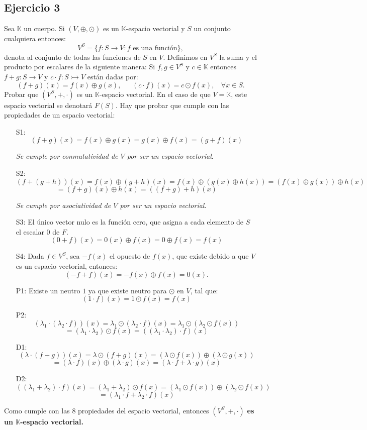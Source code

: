 \documentclass[a4paper,12pt]{article}
\begin{document}
\subsection{Ejercicio 3}
Sea $\mathbb{K}$ un cuerpo. Si $(V,\oplus, \odot)$ es un $\mathbb{K}$-espacio vectorial y $S$ un conjunto cualquiera entonces:
$$
V^S=\{ f: S \rightarrow V : f\text{ es una función}\},
$$
denota al conjunto de todas las funciones de $S$ en $V$. Definimos en $V^S$ la suma y el producto por escalares de la siguiente manera: Si $f,g \in V^S$ y $c\in \mathbb{K}$ entonces $f+g:S \rightarrow V$ y $c \cdot f : S \rightarrowtail V$ están dadas por:
$$
(f+g)(x)=f(x) \oplus g(x), \ \ \ \ \ \ \ (c \cdot f)(x) = c \odot f(x), \ \ \ \ \forall x \in S.
$$
Probar que $(V^S, +, \cdot)$ es un $\mathbb{K}$-espacio vectorial. En el caso de que $V=\mathbb{K}$, este espacio vectorial se denotará $F(S)$.
\newline Hay que probar que cumple con las propiedades de un espacio vectorial:
    \begin{itemize}
	\item[S1:]
	$$
	(f+g)(x)=f(x)\oplus g(x)=g(x) \oplus f(x) = (g+f)(x)
	$$
	\begin{center}
		\textit{Se cumple por conmutatividad de $V$ por ser un espacio vectorial}.
	\end{center}
	\item[S2:]
	$$
	(f+(g+h))(x) = f(x) \oplus (g + h)(x) = f(x) \oplus (g(x) \oplus h(x)) = (f(x) \oplus g(x)) \oplus h(x) 
	$$
	$$
	= (f+g) (x) \oplus h(x) = ((f+g)+h)(x)
	$$
	\begin{center}
		\textit{Se cumple por asociatividad de $V$ por ser un espacio vectorial}.
	\end{center}
	\item[S3:] El único vector nulo es la función cero, que asigna a cada elemento de $S$ el escalar 0 de $F$.
	$$
	(0 + f) (x) = 0(x) \oplus f(x) = 0 \oplus f(x) = f(x)
	$$
	\item[S4:] Dada $f \in V^S$, sea $-f(x)$ el opuesto de $f(x)$, que existe debido a que $V$ es un espacio vectorial, entonces:
	$$
	(-f+f)(x) = -f(x) \oplus f(x) = 0(x).
	$$ 
	\item[P1:] Existe un neutro $1$ ya que existe neutro para $\odot$ en $V$, tal que:
	$$
	(1 \cdot f)(x) = 1 \odot f(x) = f(x)
	$$
	\item[P2:]
	$$
	(\lambda_1 \cdot ( \lambda_2 \cdot f ))(x) = \lambda_1 \odot (\lambda_2 \cdot f)(x) = \lambda_1 \odot (\lambda_2 \odot f(x)) 
	$$
	$$
	= (\lambda_1 \cdot \lambda_2) \odot f(x) = ((\lambda_1 \cdot \lambda_2) \cdot f)(x)
	$$
	\item[D1:] 
	$$
	(\lambda \cdot (f + g))(x) = \lambda \odot (f + g)(x) = (\lambda \odot f(x)) \oplus (\lambda \odot g(x)) 
	$$
	$$
	= (\lambda \cdot f)(x) \oplus (\lambda \cdot g)(x) = (\lambda \cdot f + \lambda \cdot g)(x)
	$$
	\item[D2:]
	$$
	((\lambda_1 + \lambda_2)\cdot f)(x) = (\lambda_1 + \lambda_2) \odot f(x) = (\lambda_1 \odot f(x)) \oplus (\lambda_2 \odot f(x))
	$$
	$$
	= (\lambda_1 \cdot f + \lambda_2 \cdot f)(x)
	$$
\end{itemize}
Como cumple con las 8 propiedades del espacio vectorial, entonces $(V^S, +, \cdot)$ \textbf{es un $\mathbb{K}$-espacio vectorial.}
\end{document}
